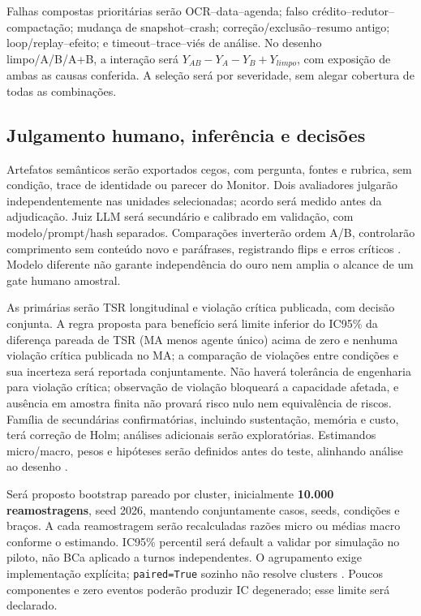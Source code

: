 \documentclass[12pt]{article}
\let\cite\citep
\newcommand{\code}[1]{\nolinkurl{#1}}
\begin{document}
Falhas compostas prioritárias serão OCR--data--agenda; falso crédito--redutor--compactação; mudança de snapshot--crash; correção/exclusão--resumo antigo; loop/replay--efeito; e timeout--trace--viés de análise. No desenho limpo/A/B/A+B, a interação será $Y_{AB}-Y_A-Y_B+Y_{limpo}$, com exposição de ambas as causas conferida. A seleção será por severidade, sem alegar cobertura de todas as combinações.

\subsection{Julgamento humano, inferência e decisões}

Artefatos semânticos serão exportados cegos, com pergunta, fontes e rubrica, sem condição, trace de identidade ou parecer do Monitor. Dois avaliadores julgarão independentemente nas unidades selecionadas; acordo será medido antes da adjudicação. Juiz LLM será secundário e calibrado em validação, com modelo/prompt/hash separados. Comparações inverterão ordem A/B, controlarão comprimento sem conteúdo novo e paráfrases, registrando flips e erros críticos \cite{zheng2023judge}. Modelo diferente não garante independência do ouro nem amplia o alcance de um gate humano amostral.

As primárias serão TSR longitudinal e violação crítica publicada, com decisão conjunta. A regra proposta para benefício será limite inferior do IC95\% da diferença pareada de TSR (MA menos agente único) acima de zero e nenhuma violação crítica publicada no MA; a comparação de violações entre condições e sua incerteza será reportada conjuntamente. Não haverá tolerância de engenharia para violação crítica; observação de violação bloqueará a capacidade afetada, e ausência em amostra finita não provará risco nulo nem equivalência de riscos. Família de secundárias confirmatórias, incluindo sustentação, memória e custo, terá correção de Holm; análises adicionais serão exploratórias. Estimandos micro/macro, pesos e hipóteses serão definidos antes do teste, alinhando análise ao desenho \cite{dror2018hitchhiker}.

Será proposto bootstrap pareado por cluster, inicialmente \textbf{10.000 reamostragens}, seed 2026, mantendo conjuntamente casos, seeds, condições e braços. A cada reamostragem serão recalculadas razões micro ou médias macro conforme o estimando. IC95\% percentil será default a validar por simulação no piloto, não BCa aplicado a turnos independentes. O agrupamento exige implementação explícita; \code{paired=True} sozinho não resolve clusters \cite{field2007cluster,scipyBootstrap}. Poucos componentes e zero eventos poderão produzir IC degenerado; esse limite será declarado.
\end{document}
